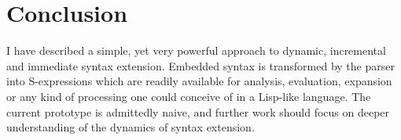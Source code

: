 \documentclass[a4paper]{llncs}
\begin{document}
\section{Conclusion}

I have described a simple, yet very powerful approach to dynamic,
incremental and immediate syntax extension. Embedded syntax is
transformed by the parser into S-expressions which are readily
available for analysis, evaluation, expansion or any kind of
processing one could conceive of in a Lisp-like language. The current
prototype is admittedly naive, and further work should focus on deeper
understanding of the dynamics of syntax extension.

{


}
\end{document}
